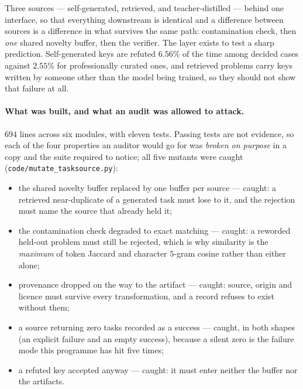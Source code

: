 Three sources --- self-generated, retrieved, and teacher-distilled --- behind one interface,
so that everything downstream is identical and a difference between sources is a difference in
what survives the same path: contamination check, then \emph{one} shared novelty buffer, then
the verifier. The layer exists to test a sharp prediction. Self-generated keys are refuted
$6.56\%$ of the time among decided cases against $2.55\%$ for professionally curated ones, and
retrieved problems carry keys written by someone other than the model being trained, so they
should not show that failure at all.

\paragraph{What was built, and what an audit was allowed to attack.}
$694$ lines across six modules, with eleven tests. Passing tests are not evidence, so each of
the four properties an auditor would go for was \emph{broken on purpose} in a copy and the
suite required to notice; all five mutants were caught
(\texttt{code/mutate\_tasksource.py}):

\begin{itemize}
\item the shared novelty buffer replaced by one buffer per source --- caught: a retrieved
  near-duplicate of a generated task must lose to it, and the rejection must name the source
  that already held it;
\item the contamination check degraded to exact matching --- caught: a reworded held-out
  problem must still be rejected, which is why similarity is the \emph{maximum} of token
  Jaccard and character $5$-gram cosine rather than either alone;
\item provenance dropped on the way to the artifact --- caught: source, origin and licence
  must survive every transformation, and a record refuses to exist without them;
\item a source returning zero tasks recorded as a success --- caught, in both shapes (an
  explicit failure and an empty success), because a silent zero is the failure mode this
  programme has hit five times;
\item a refuted key accepted anyway --- caught: it must enter neither the buffer nor the
  artifacts.
\end{itemize}

